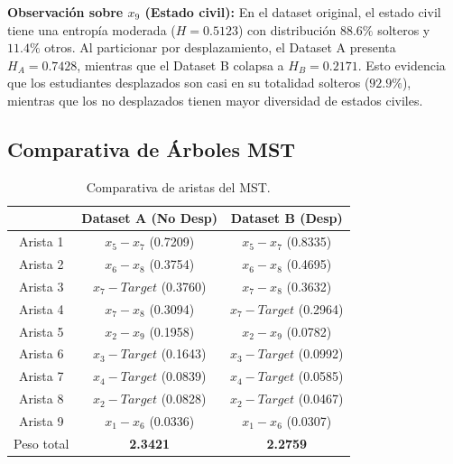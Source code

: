 \documentclass[12pt,a4paper]{article}
\begin{document}
\textbf{Observación sobre $x_9$ (Estado civil):} En el dataset original, el estado civil tiene una entropía moderada ($H = 0.5123$) con distribución $88.6\%$ solteros y $11.4\%$ otros. Al particionar por desplazamiento, el Dataset A presenta $H_A = 0.7428$, mientras que el Dataset B colapsa a $H_B = 0.2171$. Esto evidencia que los estudiantes desplazados son casi en su totalidad solteros ($92.9\%$), mientras que los no desplazados tienen mayor diversidad de estados civiles.

\subsection{Comparativa de Árboles MST}

\begin{table}[H]
    \centering
    \begin{tabular}{c|c|c}
        \toprule
        & \textbf{Dataset A (No Desp)} & \textbf{Dataset B (Desp)} \\
        \midrule
        Arista 1 & $x_5 - x_7$ (0.7209) & $x_5 - x_7$ (0.8335) \\
        Arista 2 & $x_6 - x_8$ (0.3754) & $x_6 - x_8$ (0.4695) \\
        Arista 3 & $x_7 - Target$ (0.3760) & $x_7 - x_8$ (0.3632) \\
        Arista 4 & $x_7 - x_8$ (0.3094) & $x_7 - Target$ (0.2964) \\
        Arista 5 & $x_2 - x_9$ (0.1958) & $x_2 - x_9$ (0.0782) \\
        Arista 6 & $x_3 - Target$ (0.1643) & $x_3 - Target$ (0.0992) \\
        Arista 7 & $x_4 - Target$ (0.0839) & $x_4 - Target$ (0.0585) \\
        Arista 8 & $x_2 - Target$ (0.0828) & $x_2 - Target$ (0.0467) \\
        Arista 9 & $x_1 - x_6$ (0.0336) & $x_1 - x_6$ (0.0307) \\
        \midrule
        \rowcolor{blue!15}
        Peso total & \textbf{2.3421} & \textbf{2.2759} \\
        \bottomrule
    \end{tabular}
    \caption{Comparativa de aristas del MST.}
\end{table}
\end{document}
